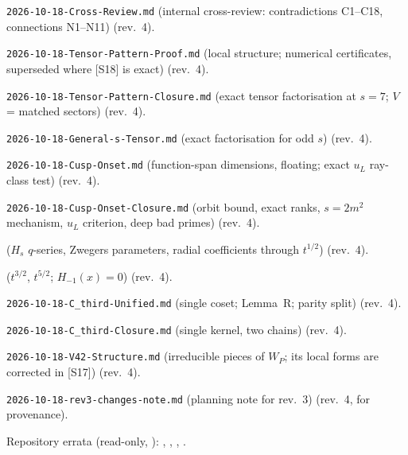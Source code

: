\documentclass[11pt]{article}
\theoremstyle{definition}
\begin{document}
\begin{enumerate}[label={[S\arabic*]},leftmargin=3em]
\item \texttt{2026-10-18-Cross-Review.md} (internal cross-review: contradictions C1--C18, connections N1--N11) (rev.~4).
\item \texttt{2026-10-18-Tensor-Pattern-Proof.md} (local structure; numerical certificates, superseded where [S18] is exact) (rev.~4).
\item \texttt{2026-10-18-Tensor-Pattern-Closure.md} (exact tensor factorisation at $s=7$; $V$ = matched sectors) (rev.~4).
\item \texttt{2026-10-18-General-s-Tensor.md} (exact factorisation for odd $s$) (rev.~4).
\item \texttt{2026-10-18-Cusp-Onset.md} (function-span dimensions, floating; exact $u_L$ ray-class test) (rev.~4).
\item \texttt{2026-10-18-Cusp-Onset-Closure.md} (orbit bound, exact ranks, $s=2m^2$ mechanism, $u_L$ criterion, deep bad primes) (rev.~4).
\item {} ($H_s$ $q$-series, Zwegers parameters, radial coefficients through $t^{1/2}$) (rev.~4).
\item {} ($t^{3/2}$, $t^{5/2}$; $H_{-1}(x)=0$) (rev.~4).
\item \texttt{2026-10-18-C\_third-Unified.md} (single coset; Lemma~R; parity split) (rev.~4).
\item \texttt{2026-10-18-C\_third-Closure.md} (single kernel, two chains) (rev.~4).
\item \texttt{2026-10-18-V42-Structure.md} (irreducible pieces of $W_P$; its local forms are corrected in [S17]) (rev.~4).
\item \texttt{2026-10-18-rev3-changes-note.md} (planning note for rev.~3) (rev.~4, for provenance).
\end{enumerate}
Repository errata (read-only, ): ,
, ,
.
\end{document}
